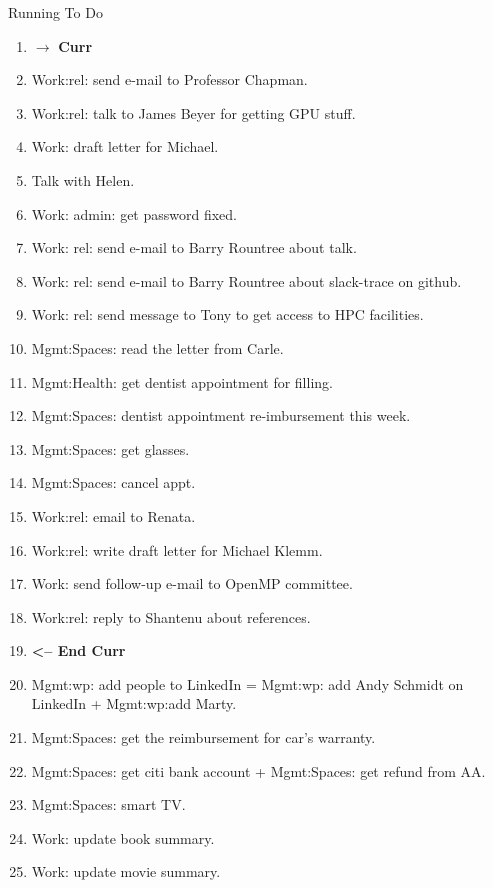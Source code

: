 


\begin{frame}[allowframebreaks]{Running To Do}
\begin{enumerate}
\item  $\rightarrow$ \textbf{Curr}
\item  Work:rel: send e-mail to Professor Chapman.  
\item  Work:rel: talk to James Beyer for getting GPU stuff.  
\item  Work: draft letter for Michael.   \pr{} 
\item  Talk with Helen. \te{} 
\item Work: admin: get password fixed. 
\item  Work: rel: send e-mail to Barry Rountree about
  talk.    
\item \tiny Work: rel: send e-mail to Barry Rountree about slack-trace
  on github.   
\item  Work: rel: send message to Tony to get access to HPC
  facilities.   

\item  Mgmt:Spaces: read the letter from Carle. 
\item Mgmt:Health: get dentist appointment for filling. 
\item Mgmt:Spaces: dentist appointment re-imbursement this week.  
\item  Mgmt:Spaces: get glasses. 
\item Mgmt:Spaces: cancel appt.
\item Work:rel: email to Renata.  

\item \tiny Work:rel: write draft letter for Michael Klemm.
\item \tiny Work: send follow-up e-mail to OpenMP committee. 
\item Work:rel: reply to Shantenu about references.
  
\item \tiny \textbf{ <-- End Curr }

\item \tiny Mgmt:wp: add people to LinkedIn =  Mgmt:wp: add Andy Schmidt on LinkedIn +  Mgmt:wp:add Marty.
\item \tiny Mgmt:Spaces: get the reimbursement for car's warranty.
\item \tiny Mgmt:Spaces: get citi bank account + Mgmt:Spaces: get
  refund from AA. 

\item \tiny Mgmt:Spaces: smart TV.
\item \tiny Work: update book summary.  
\item \tiny Work: update movie summary.

\end{enumerate}
\end{frame}

